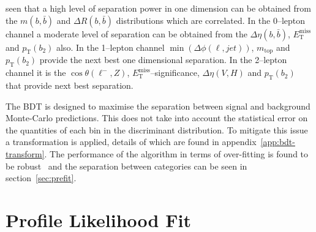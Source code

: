 seen that a high level of separation power in one dimension can be obtained from
the $m(b,\bar{b})$ and $\Delta R (b, \bar{b})$ distributions which are
correlated. In the 0--lepton channel a moderate level of separation can be
obtained from the $\Delta \eta(b, \bar{b})$, $E_{\mathrm{T}}^{\text{miss}}$ and
$p_{\mathrm{T}}(b_2)$ also. In the 1--lepton channel
$\min(\Delta\phi(\ell,jet))$, $m_{\text{top}}$ and $p_{\mathrm{T}}(b_2)$ provide
the next best one dimensional separation. In the 2--lepton channel it is the
$\cos{\theta(\ell^-,Z)}$, $E_{\mathrm{T}}^{\text{miss}}$--significance, $\Delta
\eta(V, H)$ and $p_{\mathrm{T}}(b_2)$ that provide next best separation.


The BDT is designed to maximise the separation between signal and background
Monte-Carlo predictions. This does not take into account the statistical error
on the quantities of each bin in the discriminant distribution. To mitigate this
issue a transformation is applied, details of which are found in
appendix~\ref{app:bdt-transform}. The performance of the algorithm in terms of
over-fitting is found to be robust~\cite{VHMainNote2019} and the separation
between categories can be seen in section~\ref{sec:prefit}.

\section{Profile Likelihood Fit}%
\label{sec:plf}

